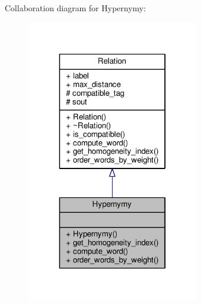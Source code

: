 Collaboration diagram for Hypernymy\+:\nopagebreak
\begin{figure}[H]
\begin{center}
\leavevmode
\includegraphics[width=214pt]{classHypernymy__coll__graph}
\end{center}
\end{figure}
